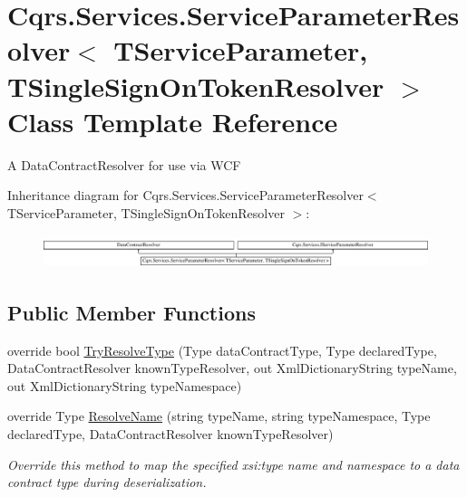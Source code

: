 \hypertarget{classCqrs_1_1Services_1_1ServiceParameterResolver}{}\section{Cqrs.\+Services.\+Service\+Parameter\+Resolver$<$ T\+Service\+Parameter, T\+Single\+Sign\+On\+Token\+Resolver $>$ Class Template Reference}
\label{classCqrs_1_1Services_1_1ServiceParameterResolver}


A Data\+Contract\+Resolver for use via W\+CF  


Inheritance diagram for Cqrs.\+Services.\+Service\+Parameter\+Resolver$<$ T\+Service\+Parameter, T\+Single\+Sign\+On\+Token\+Resolver $>$\+:\begin{figure}[H]
\begin{center}
\leavevmode
\includegraphics[height=0.989399cm]{classCqrs_1_1Services_1_1ServiceParameterResolver}
\end{center}
\end{figure}
\subsection*{Public Member Functions}
\begin{DoxyCompactItemize}
\item 
override bool \hyperlink{classCqrs_1_1Services_1_1ServiceParameterResolver_a22a2d6f220b8d2d3eba59e98dc577b43}{Try\+Resolve\+Type} (Type data\+Contract\+Type, Type declared\+Type, Data\+Contract\+Resolver known\+Type\+Resolver, out Xml\+Dictionary\+String type\+Name, out Xml\+Dictionary\+String type\+Namespace)
\item 
override Type \hyperlink{classCqrs_1_1Services_1_1ServiceParameterResolver_a1c668ecde242b87faa85a3dc89d5d974}{Resolve\+Name} (string type\+Name, string type\+Namespace, Type declared\+Type, Data\+Contract\+Resolver known\+Type\+Resolver)
\begin{DoxyCompactList}\small\item\em Override this method to map the specified xsi\+:type name and namespace to a data contract type during deserialization. \end{DoxyCompactList}\end{DoxyCompactItemize}
